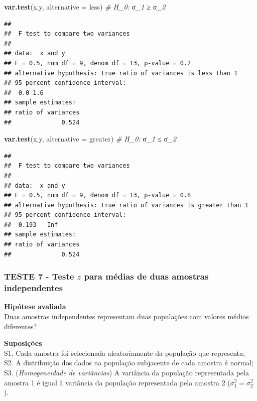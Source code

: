 \documentclass[
]{book}
\newenvironment{Shaded}{\begin{snugshade}}{\end{snugshade}}
\newcommand{\CommentTok}[1]{\textcolor[rgb]{0.56,0.35,0.01}{\textit{#1}}}
\newcommand{\DataTypeTok}[1]{\textcolor[rgb]{0.13,0.29,0.53}{#1}}
\newcommand{\KeywordTok}[1]{\textcolor[rgb]{0.13,0.29,0.53}{\textbf{#1}}}
\newcommand{\NormalTok}[1]{#1}
\newcommand{\StringTok}[1]{\textcolor[rgb]{0.31,0.60,0.02}{#1}}
\theoremstyle{definition}
\theoremstyle{definition}
\theoremstyle{definition}
\theoremstyle{remark}
\begin{document}
\begin{Shaded}
\begin{Highlighting}[]
\KeywordTok{var.test}\NormalTok{(x,y, }\DataTypeTok{alternative =} \StringTok{\textquotesingle{}less\textquotesingle{}}\NormalTok{) }\CommentTok{\# H\_0: σ\_1 ≥ σ\_2}
\end{Highlighting}
\end{Shaded}

\begin{verbatim}
## 
##  F test to compare two variances
## 
## data:  x and y
## F = 0.5, num df = 9, denom df = 13, p-value = 0.2
## alternative hypothesis: true ratio of variances is less than 1
## 95 percent confidence interval:
##  0.0 1.6
## sample estimates:
## ratio of variances 
##              0.524
\end{verbatim}

\begin{Shaded}
\begin{Highlighting}[]
\KeywordTok{var.test}\NormalTok{(x,y, }\DataTypeTok{alternative =} \StringTok{\textquotesingle{}greater\textquotesingle{}}\NormalTok{) }\CommentTok{\# H\_0: σ\_1 ≤ σ\_2}
\end{Highlighting}
\end{Shaded}

\begin{verbatim}
## 
##  F test to compare two variances
## 
## data:  x and y
## F = 0.5, num df = 9, denom df = 13, p-value = 0.8
## alternative hypothesis: true ratio of variances is greater than 1
## 95 percent confidence interval:
##  0.193   Inf
## sample estimates:
## ratio of variances 
##              0.524
\end{verbatim}

\hypertarget{teste-7---teste-z-para-muxe9dias-de-duas-amostras-independentes}{%
\subsubsection*{\texorpdfstring{TESTE 7 - Teste \(z\) para médias de duas amostras independentes}{TESTE 7 - Teste z para médias de duas amostras independentes}}\label{teste-7---teste-z-para-muxe9dias-de-duas-amostras-independentes}}

\textbf{Hipótese avaliada}\\
Duas amostras independentes representam duas populações com valores médios diferentes?

\textbf{Suposições}\\
S1. Cada amostra foi selecionada aleatoriamente da população que representa;\\
S2. A distribuição dos dados na população subjacente de cada amostra é normal;\\
S3. (\emph{Homogeneidade de variâncias}) A variância da população representada pela amostra 1 é igual à variância da população representada pela amostra 2 (\(\sigma_1^2=\sigma_2^2\)).
\end{document}
